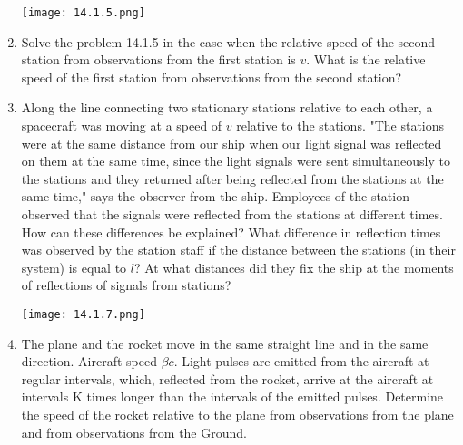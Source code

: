 \documentclass{article}
\begin{document}
\begin{enumerate}[label=14.1.\arabic*]
\begin{center}
    \texttt{[image: 14.1.5.png]}
\end{center}

\item Solve the problem 14.1.5 in the case when the relative speed of the second station from observations from the first station is $v$. What is the relative speed of the first station from observations from the second station?

\item Along the line connecting two stationary stations relative to each other, a spacecraft was moving at a speed of $v$ relative to the stations. "The stations were at the same distance from our ship when our light signal was reflected on them at the same time, since the light signals were sent simultaneously to the stations and they returned after being reflected from the stations at the same time," says the observer from the ship. Employees of the station observed that the signals were reflected from the stations at different times. How can these differences be explained? What difference in reflection times was observed by the station staff if the distance between the stations (in their system) is equal to $l$? At what distances did they fix the ship at the moments of reflections of signals from stations?

\begin{center}
    \texttt{[image: 14.1.7.png]}
\end{center}

\item The plane and the rocket move in the same straight line and in the same direction. Aircraft speed $\beta c$. Light pulses are emitted from the aircraft at regular intervals, which, reflected from the rocket, arrive at the aircraft at intervals K times longer than the intervals of the emitted pulses. Determine the speed of the rocket relative to the plane from observations from the plane and from observations from the Ground.


\end{enumerate}
\end{document}
